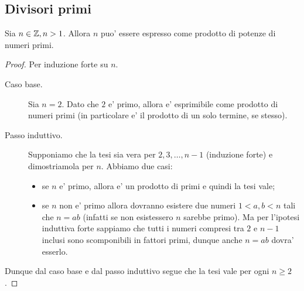 \subsection{Divisori primi}
\begin{proposition} 
    \label{esistenza_scomposizione_primi}
    Sia $n \in \mathbb{Z}, n > 1$. Allora $n$ puo' essere espresso come prodotto di potenze di numeri primi.
\end{proposition}
\begin{proof}
    Per induzione forte su $n$.
    \begin{description}
        \item[Caso base.]
        Sia $n = 2$. Dato che $2$ e' primo, allora e' esprimibile come prodotto di numeri primi (in particolare e' il prodotto di un solo termine, se stesso).
        \item[Passo induttivo.]
        Supponiamo che la tesi sia vera per $2, 3, \dots, n-1$ (induzione forte) e dimostriamola per $n$.
        Abbiamo due casi:
        \begin{itemize}
            \item se $n$ e' primo, allora e' un prodotto di primi e quindi la tesi vale;
            \item se $n$ non e' primo allora dovranno esistere due numeri $1 < a, b < n$ tali che $n = ab$ (infatti se non esistessero $n$ sarebbe primo). Ma per l'ipotesi induttiva forte sappiamo che tutti i numeri compresi tra $2$ e $n-1$ inclusi sono scomponibili in fattori primi, dunque anche $n = ab$ dovra' esserlo.
        \end{itemize}
    \end{description}
    Dunque dal caso base e dal passo induttivo segue che la tesi vale per ogni $n \geq 2$.
\end{proof}


